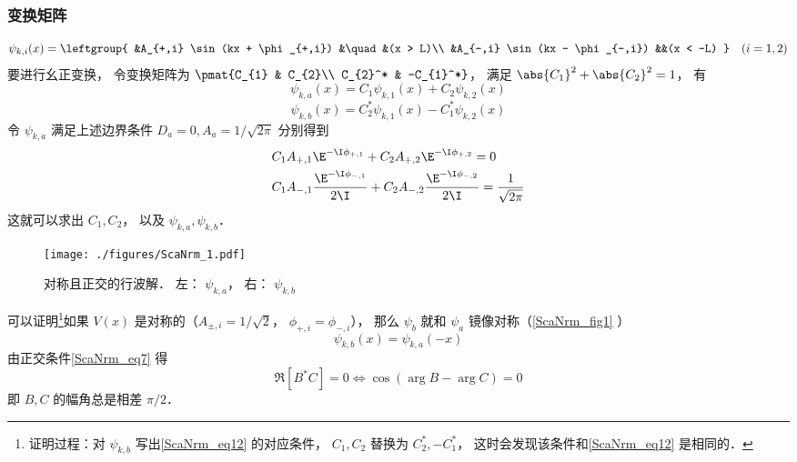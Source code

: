 \subsubsection{变换矩阵}
\begin{equation}
\psi_{k,i}(x) = \leftgroup{
    &A_{+,i} \sin(kx + \phi_{+,i}) &\quad &(x > L)\\
    &A_{-,i} \sin(kx - \phi_{-,i}) &&(x < -L)
} \quad (i = 1,2)
\end{equation}
要进行幺正变换， 令变换矩阵为 $\pmat{C_{1} & C_{2}\\ C_{2}^* & -C_{1}^*}$， 满足 $\abs{C_1}^2 + \abs{C_2}^2 = 1$， 有
\begin{equation}
\psi_{k,a}(x) = C_1\psi_{k,1}(x) + C_2\psi_{k,2}(x)
\end{equation}
\begin{equation}
\psi_{k,b}(x) = C_{2}^*\psi_{k,1}(x) - C_{1}^*\psi_{k,2}(x)
\end{equation}
令 $\psi_{k,a}$ 满足上述边界条件 $D_a = 0, A_a = 1/\sqrt{2\pi}$ 分别得到
\begin{equation}\label{ScaNrm_eq12}
\begin{aligned}
&C_1 A_{+,1}\E^{-\I\phi_{+,1}} + C_2 A_{+,2}\E^{-\I\phi_{+,2}} = 0\\
&C_1 A_{-,1}\frac{\E^{-\I\phi_{-,1}}}{2\I} + C_2 A_{-,2}\frac{\E^{-\I\phi_{-,2}}}{2\I} = \frac{1}{\sqrt{2\pi}}
\end{aligned}
\end{equation}
这就可以求出 $C_1, C_2$， 以及 $\psi_{k,a}, \psi_{k,b}$．

\begin{figure}[ht]
\centering
\texttt{[image: ./figures/ScaNrm\_1.pdf]}
\caption{对称且正交的行波解． 左： $\psi_{k,a}$， 右： $\psi_{k,b}$} \label{ScaNrm_fig1}
\end{figure}

可以证明\footnote{证明过程：对 $\psi_{k,b}$ 写出\autoref{ScaNrm_eq12} 的对应条件， $C_1,C_2$ 替换为 $C_2^*, -C_1^*$， 这时会发现该条件和\autoref{ScaNrm_eq12} 是相同的．}如果 $V(x)$ 是对称的（$A_{\pm,i} = 1/\sqrt{2}$， $\phi_{+,i}=\phi_{-,i}$）， 那么 $\psi_b$ 就和 $\psi_a$ 镜像对称（\autoref{ScaNrm_fig1} ）
\begin{equation}
\psi_{k,b}(x) = \psi_{k,a}(-x)
\end{equation}
由正交条件\autoref{ScaNrm_eq7} 得
\begin{equation}\label{ScaNrm_eq11}
\Re[B^*C] = 0 \Longleftrightarrow \cos(\arg{B} - \arg{C}) = 0
\end{equation}
即 $B,C$ 的幅角总是相差 $\pi/2$．
